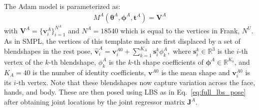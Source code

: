 The Adam model is parameterized as:
\begin{align}
M^A (\boldsymbol{\theta}^A, \boldsymbol{\phi}^A, \boldsymbol{t}^A ) = \mathbf{V}^A
\end{align}
with $\mathbf{V}^A = \{ \mathbf{v}^A_i\}_{i=1}^{N^A}$ and $N^A{=}18540$ which is equal to the vertices in Frank, $N^U$. As in SMPL, the vertices of this template mesh are first displaced by a set of blendshapes in the rest pose, $\hat{\mathbf{v}}^A_i = \mathbf{v}^{A0}_i + \sum_{k=1}^{K_A} \mathbf{s}^k_{i} \phi^A_k,$ 
where $\mathbf{s}^k_{i}\in\mathds{R}^3$ is the $i$-th vertex of the $k$-th blendshape, $\phi^A_k$ is the $k$-th shape coefficients of $\boldsymbol{\phi}^A\in\mathds{R}^{K_b}$, and $K_A=40$ is the number of identity coefficients, $\mathbf{v}^{A0}$ is the mean shape and $\mathbf{v}^{A0}_i$ is its $i$-th vertex. Note that these blendshapes now capture variation across the face, hands, and body. These are then posed using LBS as in Eq.~\eqref{eq:full_lbs_pose} after obtaining joint locations by the joint regressor matrix $\mathbf{J}^A$. %


%
	

